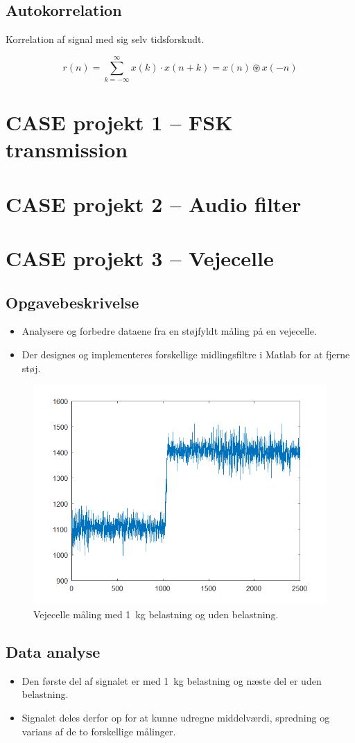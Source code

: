 \documentclass[danish]{article}
\begin{document}
\subsection{Autokorrelation}
Korrelation af signal med sig selv tidsforskudt.

\begin{equation}
r(n) = \sum_{k=-\infty}^{\infty} x(k) \cdot x(n+k) = x(n) \circledast x(-n)
\end{equation}

\newpage
\section{CASE projekt 1 – FSK transmission}
\newpage
\section{CASE projekt 2 – Audio filter}
\newpage
\section{CASE projekt 3 – Vejecelle}
\subsection{Opgavebeskrivelse}
\begin{itemize}
	\item Analysere og forbedre dataene fra en støjfyldt måling på en vejecelle.
	\item Der designes og implementeres forskellige midlingsfiltre i Matlab for at fjerne støj.
\end{itemize}

\begin{figure}[H]
	\centering
	\includegraphics[width=0.3\linewidth]{graphics/case3_1}
	\caption{Vejecelle måling med \SI{1}{\kilogram} belastning og  uden belastning.}
	\label{fig:case3_1}
\end{figure}

\subsection{Data analyse}
\begin{itemize}
	\item Den første del af signalet er med \SI{1}{\kilogram} belastning og næste del er uden belastning. 
	\item  Signalet deles derfor op for at kunne udregne middelværdi, spredning og varians af de to forskellige målinger.
\end{itemize} 
\end{document}
